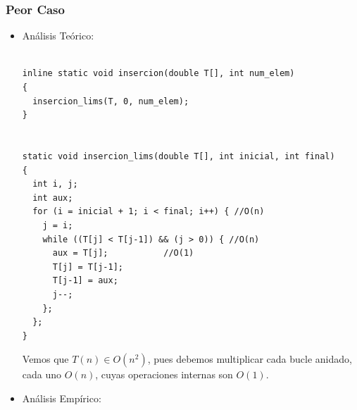 \documentclass[a4paper,12pt,twoside]{article} %
\begin{document}
	\subsubsection{Peor Caso}
	\begin{itemize}
	
		\item Análisis Teórico:
		
		\lstset{language=C++}
	\begin{lstlisting}
	
inline static void insercion(double T[], int num_elem)
{
  insercion_lims(T, 0, num_elem);
}


static void insercion_lims(double T[], int inicial, int final)
{
  int i, j;
  int aux;
  for (i = inicial + 1; i < final; i++) { //O(n)
    j = i;
    while ((T[j] < T[j-1]) && (j > 0)) { //O(n)
      aux = T[j];			//O(1)
      T[j] = T[j-1];
      T[j-1] = aux;
      j--;
    };
  };
}

	\end{lstlisting}
	
	Vemos que $T(n) \in O(n^2)$, pues debemos multiplicar cada bucle anidado, cada uno $O(n)$, cuyas operaciones internas son $O(1)$.
	
\newpage

		\item Análisis Empírico:
		

\end{itemize}
\end{document}
